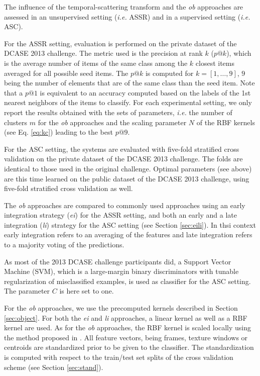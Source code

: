 \documentclass[journal]{IEEEtran}
\begin{document}
The influence of the temporal-scattering transform and the \emph{ob} approaches are assessed in an unsupervised setting (\emph{i.e.} ASSR) and in a supervised setting (\emph{i.e.} ASC). 

For the ASSR setting, evaluation is performed on the private dataset of the DCASE 2013 challenge. The metric used is the precision at rank $k$ ($p@k$), which is the  average  number  of  items  of  the  same  class among the $k$ closest items averaged for all possible seed items. The $p@k$ is computed for $k=[1,\ldots,9]$, $9$ being the number of elements that are of the same class than the seed item. Note that a $p@1$ is equivalent to an accuracy computed based on the labels of the 1st nearest neighbors of the items to classify. For each experimental setting, we only report the results obtained with the sets of parameters, \emph{i.e.} the number of clusters $m$ for the \emph{ob} approaches and the scaling parameter $N$ of the RBF kernels (see Eq. \ref{eq:kc}) leading to the best $p@9$.
 
For the ASC setting, the systems are evaluated  with five-fold  stratified cross validation on the private dataset of the DCASE 2013 challenge. The folds are identical to those used in the original challenge. Optimal parameters (see above) are this time learned on the public dataset of the DCASE 2013 challenge, using five-fold  stratified cross validation as well. 

The \emph{ob} approaches are compared to commonly used approaches using an early integration strategy (\emph{ei}) for the ASSR setting, and both an early and a late integration (\emph{li}) strategy for the ASC setting (see Section \ref{sec:eili}). In thsi context early integration refers to an averaging of the features and late integration refers to a majority voting of the predictions.

As most of the 2013 DCASE challenge participants did, a Support Vector Machine (SVM), which is a large-margin binary discriminators with tunable regularization of misclassified examples, is used as classifier for the ASC setting. The parameter $C$ is here set to one.

For the \emph{ob} approaches, we use the precomputed kernels described in Section \ref{sec:object}. For both the \emph{ei} and \emph{li} approaches, a linear kernel as well as a RBF kernel are used. As for the \emph{ob} approaches, the RBF kernel is scaled locally using the method proposed in \cite{selfTuneManor2004}. All feature vectors, being frames, texture windows or centroids are standardized prior to be given to the classifier. The standardization is computed with respect to the train/test set splits of the cross validation scheme (see Section \ref{sec:stand}).
\end{document}
